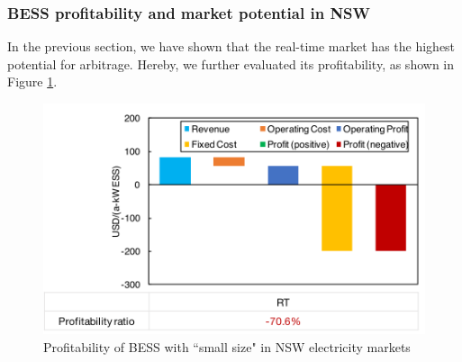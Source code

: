 \subsubsection{BESS profitability and market potential in NSW}

In the previous section, we have shown that the real-time market has the highest potential for arbitrage. Hereby, we further evaluated its profitability, as shown in Figure \ref{fig:nsw-ess-profitability}.

\begin{figure}[h!]
	\centering
	\includegraphics[width=0.8\linewidth]{Figures/NSW_ESS_profitability}
	\caption{Profitability of  BESS with ``small size" in NSW electricity markets}
	\label{fig:nsw-ess-profitability}
\end{figure}

